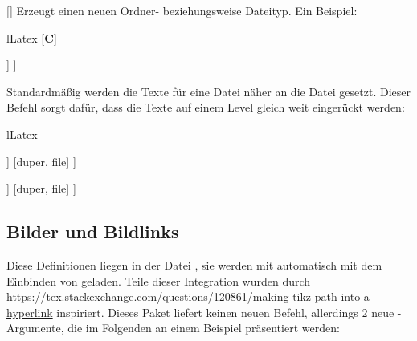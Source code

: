 %
%
%

[\cmdlist\secline{}]
Erzeugt einen neuen Ordner- beziehungsweise Dateityp. Ein Beispiel:
\begin{defaultlst}[][listing side text,righthand width=2.75cm]{lLatex}
[\textbf{C}]
\begin{fancydir}
[test
    [super, templates
        [UH.TXT, file=ChromeYellow]
        [my.c, .c]
    ]
]
\end{fancydir}
\end{defaultlst}

%
%
%

Standardmäßig werden die Texte für eine Datei näher an die Datei gesetzt. Dieser Befehl sorgt dafür, dass die Texte auf einem Level gleich weit eingerückt werden:
{
\begin{defaultlst}[][listing side text,righthand width=2.75cm]{lLatex}
\begin{fancydir}
[test
    [super,
        [Hallo, file]
        [Hallo]
    ]
    [duper, file]
]
\end{fancydir}
\SetFolderFileSameIndent
\begin{fancydir}
[test
    [super,
        [Hallo, file]
        [Hallo]
    ]
    [duper, file]
]
\end{fancydir}
\end{defaultlst}
}




%
%
%
%
%

\subsection{Bilder und Bildlinks}
Diese Definitionen liegen in der Datei , sie werden mit  automatisch mit dem Einbinden von  geladen.\medskip\newline
Teile dieser Integration wurden durch \url{https://tex.stackexchange.com/questions/120861/making-tikz-path-into-a-hyperlink} inspiriert. Dieses Paket liefert keinen neuen Befehl, allerdings $2$ neue \TikZ-Argumente, die im Folgenden an einem Beispiel präsentiert werden:

